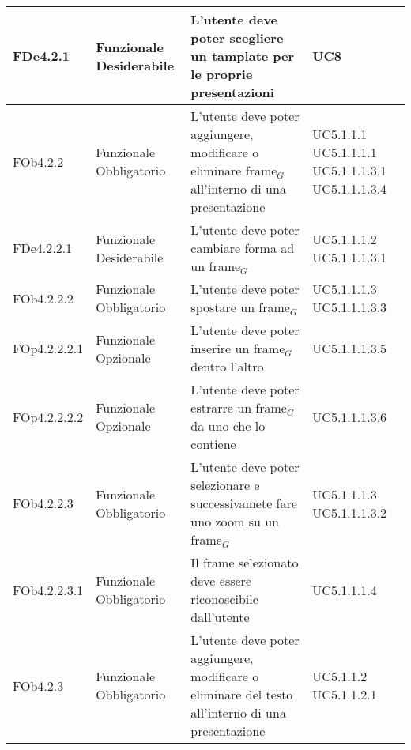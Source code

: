 \begin{longtable}{|l|p{2.5cm}|p{5cm}|p{3.5cm}|}
\hline
FDe4.2.1 & Funzionale \linebreak Desiderabile & L'utente deve poter scegliere un tamplate per le proprie presentazioni & UC8 \linebreak  \\
\hline
FOb4.2.2 & Funzionale \linebreak Obbligatorio & L'utente deve poter aggiungere, modificare o eliminare frame$_G$ all'interno di una presentazione & UC5.1.1.1 \linebreak  UC5.1.1.1.1 \linebreak  UC5.1.1.1.3.1 \linebreak  UC5.1.1.1.3.4 \linebreak  \\
\hline
FDe4.2.2.1 & Funzionale \linebreak Desiderabile & L'utente deve poter cambiare forma ad un frame$_G$ & UC5.1.1.1.2 \linebreak  UC5.1.1.1.3.1 \linebreak  \\
\hline
FOb4.2.2.2 & Funzionale \linebreak Obbligatorio & L'utente deve poter spostare un frame$_G$ & UC5.1.1.1.3 \linebreak  UC5.1.1.1.3.3 \linebreak  \\
\hline
FOp4.2.2.2.1 & Funzionale \linebreak Opzionale & L'utente deve poter inserire un frame$_G$ dentro l'altro  & UC5.1.1.1.3.5 \linebreak  \\
\hline
FOp4.2.2.2.2 & Funzionale \linebreak Opzionale & L'utente deve poter estrarre un frame$_G$ da uno che lo contiene & UC5.1.1.1.3.6 \linebreak  \\
\hline
FOb4.2.2.3 & Funzionale \linebreak Obbligatorio & L'utente deve poter selezionare e successivamete fare uno zoom su un frame$_G$ & UC5.1.1.1.3 \linebreak  UC5.1.1.1.3.2 \linebreak  \\
\hline
FOb4.2.2.3.1 & Funzionale \linebreak Obbligatorio & Il frame selezionato deve essere riconoscibile dall'utente & UC5.1.1.1.4 \linebreak  \\
\hline
FOb4.2.3 & Funzionale \linebreak Obbligatorio & L'utente deve poter aggiungere, modificare o eliminare del testo all'interno di una presentazione  & UC5.1.1.2 \linebreak  UC5.1.1.2.1 \linebreak  \\

\end{longtable}
